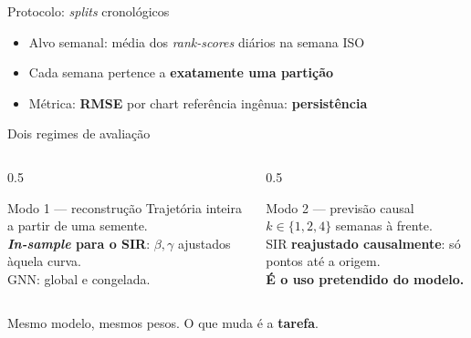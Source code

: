\documentclass[aspectratio=169]{beamer}
\newcommand{\dest}[1]{\textcolor{ufprB}{\textbf{#1}}}
\newcommand{\azul}[1]{\textcolor{ufprA}{\textbf{#1}}}
\begin{document}
\begin{frame}{Protocolo: \emph{splits} cronológicos}
  \begin{center}
  \end{center}
  \vfill
  \begin{itemize}
    \item Alvo semanal: média dos \emph{rank-scores} diários na semana ISO
    \item Cada semana pertence a \dest{exatamente uma partição}
    \item Métrica: \dest{RMSE} por chart \quad\textbullet\quad referência ingênua: \azul{persistência}
  \end{itemize}
  \vfill
\end{frame}

\begin{frame}{Dois regimes de avaliação}
  \vfill
  \begin{columns}[T]
  \begin{column}{0.5\textwidth}
    \begin{block}{Modo 1 --- reconstrução}
      Trajetória inteira a partir de uma semente.\\[0.5em]
      \dest{\emph{In-sample} para o SIR}: $\beta,\gamma$ ajustados àquela curva.\\[0.5em]
      GNN: global e congelada.
    \end{block}
  \end{column}
  \begin{column}{0.5\textwidth}
    \begin{block}{Modo 2 --- previsão causal}
      $k \in \{1,2,4\}$ semanas à frente.\\[0.5em]
      SIR \dest{reajustado causalmente}: só pontos até a origem.\\[0.5em]
      \dest{É o uso pretendido do modelo.}
    \end{block}
  \end{column}
  \end{columns}
  \vfill
  \begin{center}
  Mesmo modelo, mesmos pesos. O que muda é a \dest{tarefa}.
  \end{center}
  \vfill
\end{frame}
\end{document}
